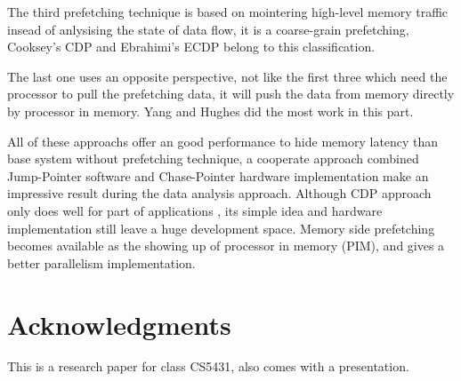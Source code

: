 \documentclass{acm_proc_article-sp}
\begin{document}
The third prefetching technique is based on mointering high-level
memory traffic insead of anlysising the state of data flow, it is a
coarse-grain prefetching, Cooksey's CDP and Ebrahimi's ECDP belong to
this classification.\cite{Cooksey:2002:SCD:635506.605427}\cite{4798232}

The last one  uses an opposite perspective, not like the first three
which need the processor to pull the prefetching data, it will push
the data from memory directly by processor in memory. Yang and Hughes
did the most work in this
part. \cite{Yang:2002:PMH:646349.690705}\cite{Hughes:2005:MPL:1066486.1066491} 

All of these approachs offer an good performance
to hide memory latency than base system without prefetching technique,
a cooperate approach combined Jump-Pointer software and Chase-Pointer
hardware implementation make an impressive result during the data
analysis approach. Although CDP approach only does well for part of
applications , its simple idea and hardware implementation still leave
a huge development space. Memory side prefetching becomes available
as the showing up of processor in memory (PIM), and gives a better
parallelism implementation. 



\section{Acknowledgments}

This is a research paper for class CS5431, also comes with a presentation.
%

%
%

\balancecolumns
\end{document}
